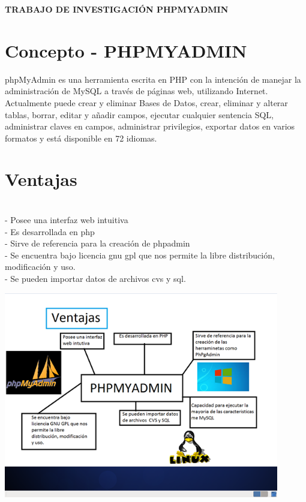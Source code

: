 
\begin{Large}
\begin{center}
\textbf{TRABAJO DE INVESTIGACIÓN PHPMYADMIN} \\
\end{center}
\end{Large}

\section{Concepto - PHPMYADMIN} 


\begin{itemize}

phpMyAdmin es una herramienta escrita en PHP con la intención de manejar la administración de MySQL a través de páginas web, utilizando Internet. Actualmente puede crear y eliminar Bases de Datos, crear, eliminar y alterar tablas, borrar, editar y añadir campos, ejecutar cualquier sentencia SQL, administrar claves en campos, administrar privilegios, exportar datos en varios formatos y está disponible en 72 idiomas.

\end{itemize} 

\section{Ventajas} 

\begin{itemize}
\\- Posee una interfaz web intuitiva
\\- Es desarrollada en php
\\- Sirve de referencia para la creación de phpadmin
\\- Se encuentra bajo licencia gnu gpl que nos permite la libre distribución, modificación y uso.
\\- Se pueden importar datos de archivos cvs y sql.
\\
\end{itemize} 
        \begin{center}
		\includegraphics[width=12cm]{./Imagenes/a}
		\end{center}
\\\
